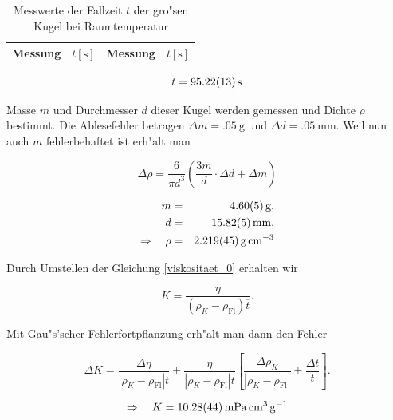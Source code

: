		\begin{table}[h!]
			\centering
			\caption{Messwerte der Fallzeit $t$ der gro"sen Kugel bei Raumtemperatur}
			\begin{tabular}{|c|c||c|c|}
				\hline
				Messung & $t [\mathrm{s}]$ & Messung & $t [\mathrm{s}]$ \\
				\hline
				\hline
				
				\hline
			\end{tabular}
		\end{table}

		\begin{equation*}
			\overline{t} = \SI{95.22 (13)}{\second}
		\end{equation*}

		Masse $m$ und Durchmesser $d$ dieser Kugel werden gemessen und Dichte $\rho$ bestimmt. Die Ablesefehler betragen $\Delta m = \SI{.05}{\gram}$ und $\Delta d = \SI{.05}{\milli \meter}$.
		Weil nun auch $m$ fehlerbehaftet ist erh"alt man

		\begin{equation*}
			\Delta \rho = \frac{6}{\pi d^3} \left( \frac{3 m}{d} \cdot \Delta d + \Delta m \right)
		\end{equation*}

		\begin{eqnarray*}
				m & = & \SI{4.60 (5)}{\gram} , \\
				d & = & \SI{15.82 (5)}{\milli \meter} , \\
				\Rightarrow \quad \rho & = & \SI{2.219 (45)}{\gram \per \centi \meter \cubed}
		\end{eqnarray*}

		Durch Umstellen der Gleichung \eqref{viskositaet_0} erhalten wir

		\begin{equation}
			K = \frac{\eta}{\left(\rho_K - \rho_\mathrm{Fl}\right) \overline{t}} .
		\end{equation}

		Mit Gau"s'scher Fehlerfortpflanzung erh"alt man dann den Fehler

		\begin{equation*}
			\Delta K = \frac{\Delta \eta}{\left|\rho_K - \rho_\mathrm{Fl}\right| t} + \frac{\eta}{\left|\rho_K - \rho_\mathrm{Fl}\right| t} \left[ \frac{\Delta \rho_K}{\left| \rho_K - \rho_\mathrm{Fl} \right|} + \frac{\Delta t}{t} \right] .
		\end{equation*}

		\begin{equation*}
			\Rightarrow \quad K = \SI{10.28 (44)}{\milli \pascal \centi \meter \cubed \per \gram}
		\end{equation*}

